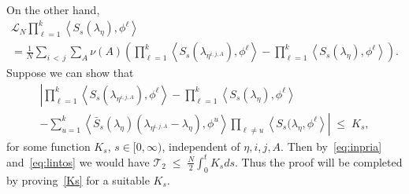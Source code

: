 \documentclass[AHL,Unicode,longabstracts,published]{cedram}
\renewcommand{\leq}{\;\leqslant\;}
\newcommand{\cL}{\mathcal{L}}
\newcommand{\cT}{\mathcal{T}}
\let\l=\lambda
\begin{document}
On the other hand,
\begin{multline}
\cL_N\prod_{\ell=1}^k\left\langle S_s(\l_{\eta}),\phi^\ell\right\rangle\\
=
\frac1{N} \sum_{i\,<\,j}\sum_A\nu(A) \left(\prod_{\ell=1}^k\left\langle S_s(\l_{\eta^{i,j,A}}),\phi^\ell\right\rangle -\prod_{\ell=1}^k\left\langle S_s(\l_{\eta}),\phi^\ell\right\rangle \right).
\end{multline}
Suppose we can show that
\begin{multline}\label{Ks}
\left|\prod_{\ell=1}^k\left\langle S_s(\l_{\eta^{i,j,A}}),\phi^\ell\right\rangle -\prod_{\ell=1}^k\left\langle S_s(\l_{\eta}),\phi^\ell\right\rangle\right.\\
-\left. \sum_{u=1}^k\left\langle \bar S_s(\l_\eta)(\l_{\eta^{i,j,A}} -\l_{\eta}),\phi^u\right\rangle\prod_{\ell\neq u}\left\langle S_s(\l_{\eta},\phi^\ell\right\rangle
\right|\leq K_s,
\end{multline}
for some function $K_s$, $s\in[0,\infty)$, independent of $\eta,i,j,A$. Then by~\eqref{eq:inpria} and~\eqref{eq:lintos} we would have $\cT_2\leq \frac{N}2\int_0^tK_s ds$. Thus the proof will be completed by proving~\eqref{Ks} for a suitable $K_s$.
\end{document}
